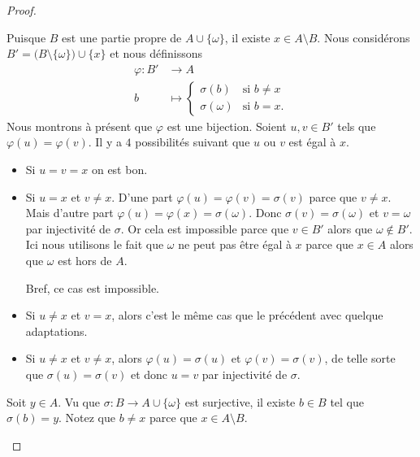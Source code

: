 \begin{proof}
\begin{subproof}
\begin{subproof}
			Puisque \( B\) est une partie propre de \( A\cup\{ \omega \}\), il existe \( x\in A\setminus B\). Nous considérons \( B'=\big( B\setminus\{ \omega \} \big)\cup\{ x \}\) et nous définissons
			\begin{equation}
				\begin{aligned}
					\varphi\colon B' & \to A                                       \\
					b                & \mapsto \begin{cases}
						                           \sigma(b)      & \text{si } b\neq x \\
						                           \sigma(\omega) & \text{si } b=x.
					                           \end{cases}
				\end{aligned}
			\end{equation}
			Nous montrons à présent que \( \varphi\) est une bijection.
			\spitem[Injectif]
			Soient \( u,v\in B'\) tels que \( \varphi(u)=\varphi(v)\). Il y a \( 4\) possibilités suivant que \( u\) ou \( v\) est égal à \( x\).
			\begin{itemize}

				\item
				      Si \( u=v=x\) on est bon.
				\item

				      Si \( u=x\) et \( v\neq x\). D'une part \( \varphi(u)=\varphi(v)=\sigma(v)\) parce que \( v\neq x\). Mais d'autre part \( \varphi(u)=\varphi(x)=\sigma(\omega)\). Donc \( \sigma(v)=\sigma(\omega)\) et \( v=\omega\) par injectivité de \( \sigma\). Or cela est impossible parce que \( v\in B'\) alors que \( \omega\not\in B'\). Ici nous utilisons le fait que \( \omega\) ne peut pas être égal à \( x\) parce que \( x\in A\) alors que \( \omega\) est hors de \( A\).

				      Bref, ce cas est impossible.
				\item
				      Si \( u\neq x\) et \( v=x\), alors c'est le même cas que le précédent avec quelque adaptations.
				\item
				      Si \( u\neq x\) et \( v\neq x\), alors \( \varphi(u)=\sigma(u)\) et \( \varphi(v)=\sigma(v)\), de telle sorte que \( \sigma(u)=\sigma(v)\) et donc \( u=v\) par injectivité de \( \sigma\).
			\end{itemize}
			\spitem[Surjective]
			Soit \( y\in A\). Vu que \( \sigma\colon B\to A\cup\{ \omega \}\) est surjective, il existe \( b\in B\) tel que \(\sigma(b)=y\). Notez que \( b\neq x\) parce que \( x\in A\setminus B\).


\end{subproof}
\end{subproof}
\end{proof}
